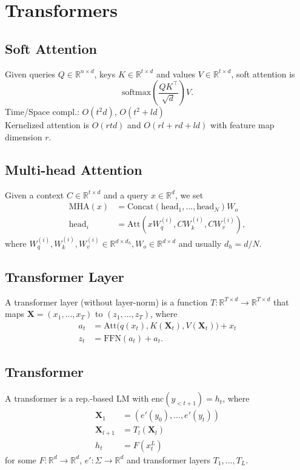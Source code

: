 \section{Transformers}
\subsection*{Soft Attention}
Given queries $Q\in\mathbb{R}^{n\times d}$, keys $K\in\mathbb{R}^{t\times d}$ and values $V\in\mathbb{R}^{t\times d}$, soft attention is $$\text{softmax}\left(\frac{Q K^\top}{\sqrt{d}}\right)V.$$ Time/Space compl.: $O(t^2d)$, $O(t^2+ld)$\\
Kernelized attention is $O(rtd)$ and $O(rl + rd + ld)$ with feature map dimension $r$.

\subsection*{Multi-head Attention}
Given a context $C\in\mathbb{R}^{t\times d}$ and a query $x\in\mathbb{R}^d$, we set
\begin{equation*}
    \begin{aligned}
        \text{MHA}(x) & =\text{Concat}(\text{head}_1,...,\text{head}_N)W_o \\
        \text{head}_i & =\text{Att}(xW_q^{(i)},CW_k^{(i)},CW_v^{(i)}),
    \end{aligned}
\end{equation*}
where $W_q^{(i)},W_k^{(i)},W_v^{(i)}\in\mathbb{R}^{d\times d_h},W_o\in\mathbb{R}^{d\times d}$ and usually $d_h=d/N$.

\subsection*{Transformer Layer}
A transformer layer (without layer-norm) is a function $T: \mathbb{R}^{T\times d}\rightarrow\mathbb{R}^{T\times d}$ that maps $\mathbf{X}=(x_1,...,x_T)$ to $(z_1,...,z_T)$, where
\begin{equation*}
    \begin{aligned}
        a_t & = \text{Att}\big(q(x_t), K(\mathbf{X}_t), V(\mathbf{X}_t)\big) + x_t \\
        z_t & = \text{FFN}(a_t) + a_t.
    \end{aligned}
\end{equation*}

\subsection*{Transformer}
A transformer is a rep.-based LM with $\text{enc}(y_{<t+1})=h_t$, where
\begin{equation*}
    \begin{aligned}
        \mathbf{X}_1     & = (e'(y_0),...,e'(y_{t})) \\
        \mathbf{X}_{l+1} & = T_{l}(\mathbf{X}_{l})   \\
        h_t              & = F(x^L_t)
    \end{aligned}
\end{equation*}
for some $F:\mathbb{R}^{d}\rightarrow\mathbb{R}^d$, $e':\Sigma\rightarrow\mathbb{R}^d$ and transformer layers $T_1,...,T_L$.

